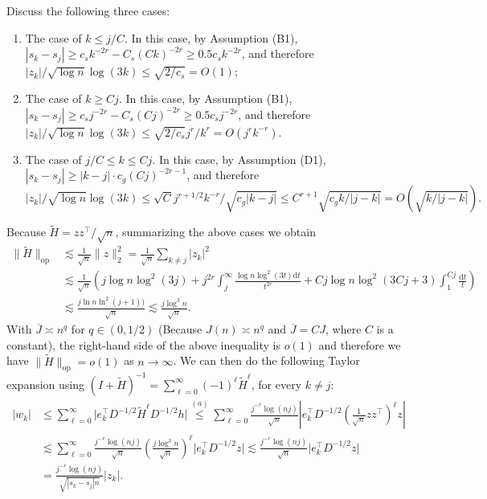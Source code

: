\documentclass[11pt,a4paper]{article}
\renewcommand{\tilde}{\widetilde}
\renewcommand{\bar}{\overline}
\theoremstyle{definition}
\theoremstyle{plain}
\theoremstyle{remark}
\newcommand{\op}{\mathrm{op}}
\newcommand{\ud}{\mathrm d}
\begin{document}
Discuss the following three cases:
\begin{enumerate}
\item The case of $k\leq j/C$. In this case, by Assumption (B1), $|s_k-s_j|\geq c_s k^{-2r} - C_s(Ck)^{-2r}\geq 0.5c_sk^{-2r}$, and therefore $|z_k|/\sqrt{\log n}\log(3k)\leq \sqrt{2/c_s}=O(1)$;
\item The case of $k\geq Cj$. In this case, by Assumption (B1), $|s_k-s_j| \geq c_s j^{-2r} - C_s (Cj)^{-2r}\geq 0.5c_s j^{-2r}$, and therefore $|z_k|/\sqrt{\log n}\log(3k)\leq \sqrt{2/c_s}j^r/k^r= O(j^rk^{-r})$.
\item The case of $j/C\leq k\leq Cj$. In this case, by Assumption (D1), $|s_k-s_j| \geq |k-j| \cdot c_g(Cj)^{-2r-1}$, and therefore 
$$
|z_k|/\sqrt{\log n}\log(3k)\leq \sqrt{C}j^{r+1/2}k^{-r}/\sqrt{c_g|k-j|}\leq C^{r+1}\sqrt{c_gk/|j-k|}= O(\sqrt{k/|j-k|}).
$$
\end{enumerate}
Because $\tilde H=zz^\top/\sqrt{n}$, summarizing the above cases we obtain 
\begin{align}
\|\tilde H\|_\op&\lesssim \frac{1}{\sqrt{n}}\|z\|_2^2 =\frac{1}{\sqrt{n}}\sum_{k\neq j}|z_k|^2 \nonumber\\
& \lesssim \frac{1}{\sqrt{n}}\left(j\log n\log^2(3j) + j^{2r}\int_j^{\infty}\frac{\log n\log^2 (3t)\ud t}{t^{2r}} + Cj\log n\log^2 (3Cj+3)\int_1^{Cj} \frac{\ud t}{t}\right)\nonumber\\
& \lesssim \frac{j\ln n\ln^2 (j+1))}{\sqrt{n}}\lesssim \frac{j\log^3 n}{\sqrt{n}}.
\end{align}
With $\bar J\asymp n^q$ for $q\in(0,1/2)$ (Because $J(n)\asymp n^q$ and $\bar J=CJ$, where $C$ is a constant), the right-hand side of the above inequality is $o(1)$ and therefore we have $\|\tilde H\|_\op=o(1)$ as $n\to\infty$.
We can then do the following Taylor expansion using $(I+\tilde H)^{-1} = \sum_{\ell=0}^{\infty} (-1)^\ell \tilde H^\ell$, for every $k\neq j$:
\begin{align}
|w_k| &\leq \sum_{\ell=0}^{\infty} \big|e_k^\top D^{-1/2}\tilde H^\ell D^{-1/2}h\big| \overset{(a)}{\leq }\sum_{\ell=0}^{\infty} \frac{j^{-r}\log(nj)}{\sqrt{n}}\left|e_k^\top D^{-1/2}\left(\frac{1}{\sqrt{n}}zz^\top\right)^\ell z\right|\nonumber\\
&\lesssim \sum_{\ell=0}^{\infty}\frac{j^{-r}\log(nj)}{\sqrt{n}}\left(\frac{j\log^3 n}{\sqrt{n}}\right)^\ell \big|e_k^\top D^{-1/2}z\big| \lesssim\frac{j^{-r}\log(nj)}{\sqrt{n}}\big|e_k^\top D^{-1/2}z\big|\nonumber\\
& = \frac{j^{-r}\log (nj)}{\sqrt{|s_k-s_j| n}}\big|z_k\big|.\label{eq:proof-stability-4} 
\end{align}
\end{document}
